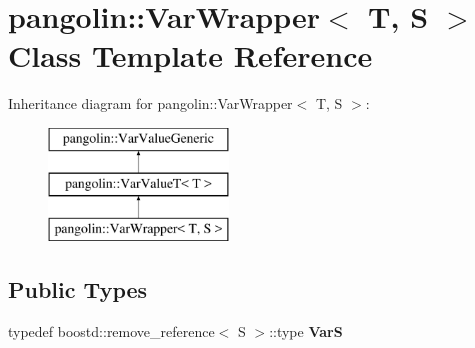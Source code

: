 \hypertarget{classpangolin_1_1_var_wrapper}{}\section{pangolin\+:\+:Var\+Wrapper$<$ T, S $>$ Class Template Reference}
\label{classpangolin_1_1_var_wrapper}
Inheritance diagram for pangolin\+:\+:Var\+Wrapper$<$ T, S $>$\+:\begin{figure}[H]
\begin{center}
\leavevmode
\includegraphics[height=3.000000cm]{classpangolin_1_1_var_wrapper}
\end{center}
\end{figure}
\subsection*{Public Types}
\begin{DoxyCompactItemize}
\item 
typedef boostd\+::remove\+\_\+reference$<$ S $>$\+::type {\bfseries VarS}\hypertarget{classpangolin_1_1_var_wrapper_a1741ffb425600ad19c2e5c31e7cf879c}{}\label{classpangolin_1_1_var_wrapper_a1741ffb425600ad19c2e5c31e7cf879c}

\end{DoxyCompactItemize}

